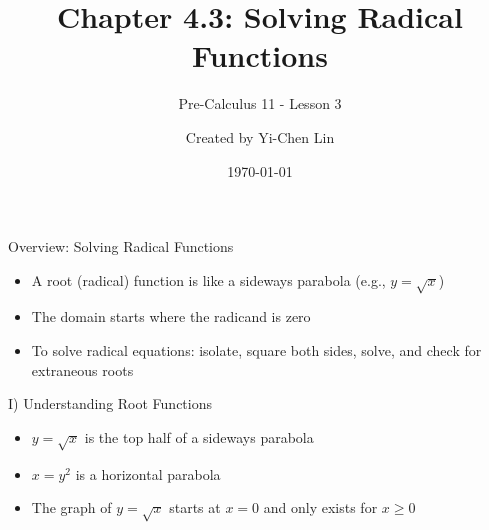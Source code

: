 \documentclass[aspectratio=169]{beamer}
\title{Chapter 4.3: Solving Radical Functions}
\subtitle{Pre-Calculus 11 - Lesson 3}
\author{Created by Yi-Chen Lin}
\date{\today}
\begin{document}
\begin{frame}
\titlepage
\end{frame}

\begin{frame}{Overview: Solving Radical Functions}
\begin{tcolorbox}[colback=lightgray,colframe=primary,title=Key Concepts]
\footnotesize
\begin{itemize}
  \item A root (radical) function is like a sideways parabola (e.g., $y=\sqrt{x}$)
  \item The domain starts where the radicand is zero
  \item To solve radical equations: isolate, square both sides, solve, and check for extraneous roots
\end{itemize}
\end{tcolorbox}
\end{frame}

\begin{frame}{I) Understanding Root Functions}
\begin{tcolorbox}[colback=lightgray,colframe=primary,title=Key Points]
\footnotesize
\begin{itemize}
  \item $y=\sqrt{x}$ is the top half of a sideways parabola
  \item $x=y^2$ is a horizontal parabola
  \item The graph of $y=\sqrt{x}$ starts at $x=0$ and only exists for $x\geq0$
\end{itemize}
\end{tcolorbox}
\vspace{0.5em}
\begin{center}
\end{center}
\end{frame}
\end{document}
